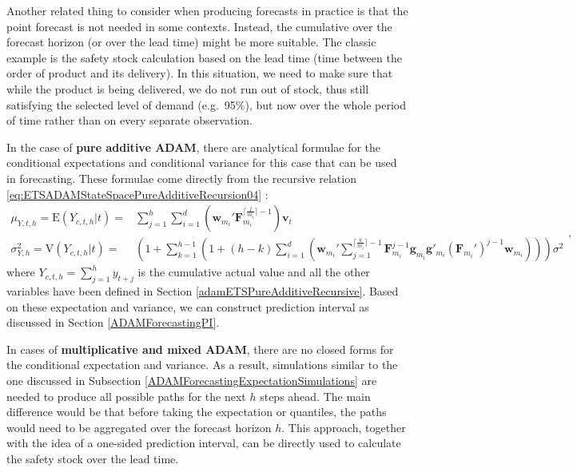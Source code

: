 \documentclass[
]{book}
\theoremstyle{definition}
\theoremstyle{definition}
\theoremstyle{definition}
\theoremstyle{definition}
\theoremstyle{remark}
\begin{document}
Another related thing to consider when producing forecasts in practice is that the point forecast is not needed in some contexts. Instead, the cumulative over the forecast horizon (or over the lead time) might be more suitable. The classic example is the safety stock calculation based on the lead time (time between the order of product and its delivery). In this situation, we need to make sure that while the product is being delivered, we do not run out of stock, thus still satisfying the selected level of demand (e.g.~95\%), but now over the whole period of time rather than on every separate observation.

In the case of \textbf{pure additive ADAM}, there are analytical formulae for the conditional expectations and conditional variance for this case that can be used in forecasting. These formulae come directly from the recursive relation \eqref{eq:ETSADAMStateSpacePureAdditiveRecursion04} \citep[for derivations in a simpler case, see for example,][\citet{Svetunkov2017}]{Hyndman2008b}:
\begin{equation}
    \begin{aligned}
        \mu_{Y,t,h} = \text{E}(Y_{c,t,h}|t) = & \sum_{j=1}^h \sum_{i=1}^d \left(\mathbf{w}_{m_i}'     \mathbf{F}_{m_i}^{\lceil\frac{j}{m_i}\rceil-1} \right) \mathbf{v}_{t} \\
        \sigma^2_{Y,h} = \text{V}(Y_{c,t,h}|t) = & \left(1 + \sum_{k=1}^{h-1} \left(1+ (h-k) \sum_{i=1}^d \left(\mathbf{w}_{m_i}' \sum_{j=1}^{\lceil\frac{k}{m_i}\rceil-1} \mathbf{F}_{m_i}^{j-1} \mathbf{g}_{m_i} \mathbf{g}'_{m_i} (\mathbf{F}_{m_i}')^{j-1} \mathbf{w}_{m_i} \right) \right) \right) \sigma^2
    \end{aligned},
    \label{eq:ETSADAMStateSpacePureAdditiveRecursionMeanAndVarianceCumulative}
\end{equation}
where \(Y_{c,t,h}=\sum_{j=1}^h y_{t+j}\) is the cumulative actual value and all the other variables have been defined in Section \ref{adamETSPureAdditiveRecursive}. Based on these expectation and variance, we can construct prediction interval as discussed in Section \ref{ADAMForecastingPI}.

In cases of \textbf{multiplicative and mixed ADAM}, there are no closed forms for the conditional expectation and variance. As a result, simulations similar to the one discussed in Subsection \ref{ADAMForecastingExpectationSimulations} are needed to produce all possible paths for the next \(h\) steps ahead. The main difference would be that before taking the expectation or quantiles, the paths would need to be aggregated over the forecast horizon \(h\). This approach, together with the idea of a one-sided prediction interval, can be directly used to calculate the safety stock over the lead time.
\end{document}
